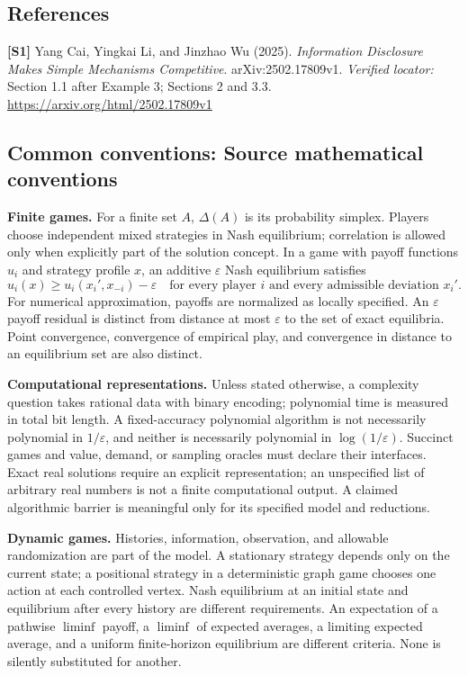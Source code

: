 \documentclass[11pt,a4paper]{article}
\begin{document}
\subsection*{References}
\begingroup\footnotesize\raggedright
\textbf{[S1]} Yang Cai, Yingkai Li, and Jinzhao Wu (2025). \emph{Information Disclosure Makes Simple Mechanisms Competitive}. arXiv:2502.17809v1. \textit{Verified locator:} Section 1.1 after Example 3; Sections 2 and 3.3. \url{https://arxiv.org/html/2502.17809v1}
\par\endgroup

\subsection*{Common conventions: Source mathematical conventions}

\textbf{Finite games.} For a finite set $A$, $\Delta(A)$ is its probability
simplex. Players choose independent mixed strategies in Nash equilibrium;
correlation is allowed only when explicitly part of the solution concept.
In a game with payoff functions $u_i$ and strategy profile $x$, an additive
$\varepsilon$ Nash equilibrium satisfies
\[
 u_i(x)\geq u_i(x_i',x_{-i})-\varepsilon
 \quad\text{for every player $i$ and every admissible deviation $x_i'$}.
\]
For numerical approximation, payoffs are normalized as locally specified.
An $\varepsilon$ payoff residual is distinct from distance at most
$\varepsilon$ to the set of exact equilibria. Point convergence, convergence
of empirical play, and convergence in distance to an equilibrium set are
also distinct.

\textbf{Computational representations.} Unless stated otherwise, a complexity
question takes rational data with binary encoding; polynomial time is measured
in total bit length. A fixed-accuracy polynomial algorithm is not necessarily
polynomial in $1/\varepsilon$, and neither is necessarily polynomial in
$\log(1/\varepsilon)$. Succinct games and value, demand, or sampling oracles
must declare their interfaces. Exact real solutions require an explicit
representation; an unspecified list of arbitrary real numbers is not a
finite computational output. A claimed algorithmic barrier is meaningful
only for its specified model and reductions.

\textbf{Dynamic games.} Histories, information, observation, and allowable
randomization are part of the model. A stationary strategy depends only on
the current state; a positional strategy in a deterministic graph game
chooses one action at each controlled vertex. Nash equilibrium at an initial
state and equilibrium after every history are different requirements.
An expectation of a pathwise $\liminf$ payoff, a $\liminf$ of expected averages,
a limiting expected average, and a uniform finite-horizon equilibrium are
different criteria. None is silently substituted for another.
\end{document}
